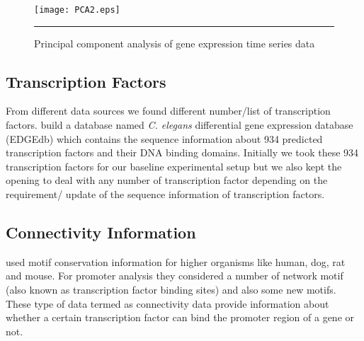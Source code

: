 \begin{figure}
	\centering
		\texttt{[image: PCA2.eps]}
		\rule{35em}{0.5pt}
	\caption[Principal component analysis of time series data ]
		{Principal component analysis of gene expression time series data}
	\label{fig:PCA_time_series}
\end{figure}

\subsection{Transcription Factors}
From different data sources we found different number/list of transcription factors. \cite{Inmaculada:2007} build a database named \textit{C. elegans} differential gene expression database 
(EDGEdb) which contains the sequence information about 934 predicted transcription factors and their DNA binding domains. Initially we took these 934 transcription factors for our baseline experimental setup
but we also kept the opening to deal with any number of transcription factor depending on the requirement/ update of the sequence information of transcription factors.

\subsection{Connectivity Information}
\cite{Xie:2005} used motif conservation information for higher organisms like human, dog, rat and mouse. For promoter analysis they considered a number of network motif (also known as transcription factor binding sites) and also some new motifs. These type of data termed as connectivity data \cite{Liao:2003} provide information about whether a certain transcription factor can bind the promoter region of a gene or not.

